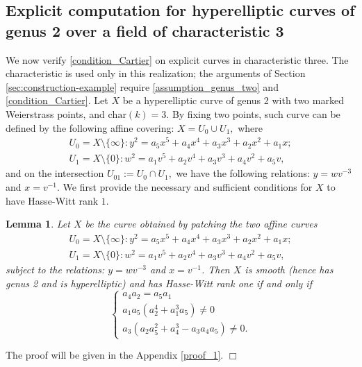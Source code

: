 \documentclass[12pt,a4]{amsart}
\newtheorem{lem}[claim]{Lemma}
\theoremstyle{definition}
\begin{document}
 
\subsection{Explicit computation for hyperelliptic curves of genus 2 over a field of characteristic 3}
\label{sect_genus_2}
We now verify \eqref{condition_Cartier} on explicit curves in
characteristic three. The characteristic is used only in this realization;
the arguments of Section \ref{sec:construction-example} require
\eqref{assumption_genus_two} and \eqref{condition_Cartier}.
Let $X$ be a hyperelliptic curve of genus 2 with two marked Weierstrass points, and 
$\text{char}(k)=3.$ By fixing two points, such curve can be defined by the following affine covering: $X = U_0 \cup U_1,$ where
\begin{align*}
	U_0 = X \setminus \{\infty\}: y^2 = a_5x^5+a_4x^4+a_3x^3+a_2x^2+a_1x; \\
	U_1 = X \setminus \{0\}: w^2 = a_1v^5+a_2v^4+a_3v^3+a_4v^2+a_5v,
\end{align*}
and on the intersection $U_{01}:= U_0 \cap U_1,$ we have the following relations: $y =  w v^{-3}$
and $x = v^{-1}.$ 
We first provide the necessary and sufficient conditions for $X$ to have Hasse-Witt rank $1$. 

\begin{lem} \label{Hasse-Witt rank one}
Let $X$ be the curve obtained by patching the two affine curves
\begin{align*}
	U_0 = X \setminus \{\infty\}: y^2 = a_5x^5+a_4x^4+a_3x^3+a_2x^2+a_1x; \\
	U_1 = X \setminus \{0\}: w^2 = a_1v^5+a_2v^4+a_3v^3+a_4v^2+a_5v,
\end{align*}
subject to the relations: $y =  w v^{-3}$ and $x = v^{-1}$. 
Then  $X$ is smooth (hence has genus 2 and is hyperelliptic)
and has Hasse-Witt rank one  if and only if 
$$\begin{cases} a_4a_2 = a_5a_1 \\ a_1a_5(a_2^{4} + a_1^{3}a_5) \neq 0\\
a_3(a_2a_5^2+a_4^3-a_3a_4a_5)\neq 0. \end{cases}$$
\end{lem}  
\noindent The proof will be given in the Appendix \ref{proof_1}. \hfill $\Box$
 
\end{document}
